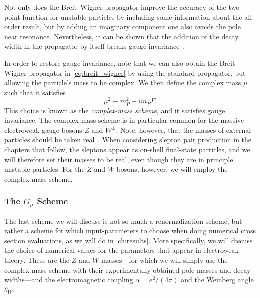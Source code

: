 Not only does the Breit--Wigner propagator improve the accuracy of the two-point function for unstable particles by including some information about the all-order result, but by adding an imaginary component one also avoids the pole near resonance.
Nevertheless, it can be shown that the addition of the decay width in the propagator by itself breaks gauge invariance~\cite{Denner:2019vbn}.

In order to restore gauge invariance, note that we can also obtain the Breit--Wigner propagator in \cref{eq:breit_wigner} by using the standard propagator, but allowing the particle's mass to be complex.
We then define the complex mass $\mu$ such that it satisfies
\begin{equation}\label{eq:complex_mass}
    \mu^2 \equiv m_P^2 - im_P\Gamma.
\end{equation}
This choice is known as the \emph{complex-mass scheme}, and it satisfies gauge invariance.
The complex-mass scheme is in particular common for the massive electroweak gauge bosons $Z$ and $W^\pm$.
Note, however, that the masses of external particles should be taken real~\cite{Denner:2019vbn}.
When considering slepton pair production in the chapters that follow, the sleptons appear as on-shell final-state particles, and we will therefore set their masses to be real, even though they are in principle unstable particles.
For the $Z$ and $W$ bosons, however, we will employ the complex-mass scheme.


\subsubsection{The \texorpdfstring{$G_\mu$}{Gmu} Scheme}
The last scheme we will discuss is not so much a renormalization scheme, but rather a scheme for which input-parameters to choose when doing numerical cross section evaluations, as we will do in \cref{ch:results}.
More specifically, we will discuss the choice of numerical values for the parameters that appear in electroweak theory.
These are the $Z$ and $W$ masses---for which we will simply use the complex-mass scheme with their experimentally obtained pole masses and decay widths---and the electromagnetic coupling $\alpha=e^2/(4\pi)$ and the Weinberg angle $\theta_W$.

